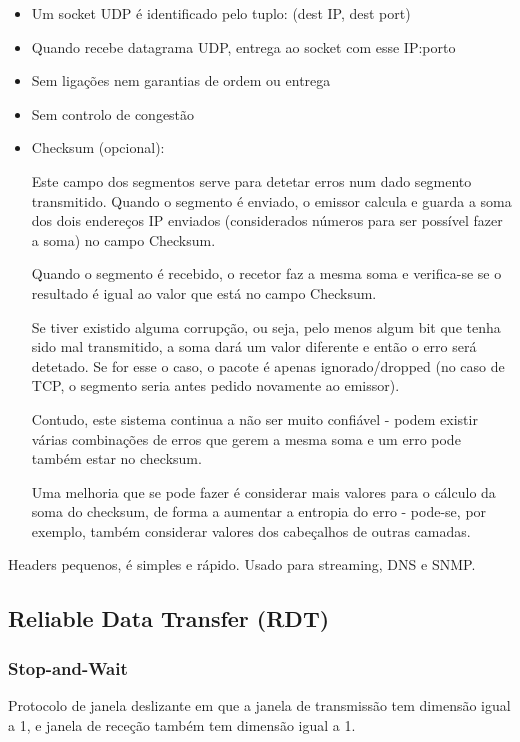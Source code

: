 \documentclass[12pt]{article}
\begin{document}
\begin{itemize}
    \item Um socket UDP é identificado pelo tuplo: (dest IP, dest port)
    \item Quando recebe datagrama UDP, entrega ao socket com esse IP:porto
    \item Sem ligações nem garantias de ordem ou entrega
    \item Sem controlo de congestão
    \item Checksum (opcional):

    Este campo dos segmentos serve para detetar erros num dado segmento transmitido.
    Quando o segmento é enviado, o emissor calcula e guarda a soma dos dois endereços IP enviados (considerados números para ser possível fazer a soma) no campo Checksum.

    Quando o segmento é recebido, o recetor faz a mesma soma e verifica-se se o resultado é igual ao valor que está no campo Checksum.

    Se tiver existido alguma corrupção, ou seja, pelo menos algum bit que tenha sido mal transmitido, a soma dará um valor diferente e então o erro será detetado.
    Se for esse o caso, o pacote é apenas ignorado/dropped (no caso de TCP, o segmento seria antes pedido novamente ao emissor).
    
    Contudo, este sistema continua a não ser muito confiável - podem existir várias combinações de erros que gerem a mesma soma e um erro pode também estar no checksum.
    
    Uma melhoria que se pode fazer é considerar mais valores para o cálculo da soma do checksum, de forma a aumentar a entropia do erro - pode-se, por exemplo, também considerar valores dos cabeçalhos de outras camadas.
\end{itemize}

Headers pequenos, é simples e rápido. Usado para streaming, DNS e SNMP.

\subsection{Reliable Data Transfer (RDT)}

\subsubsection{Stop-and-Wait}

Protocolo de janela deslizante em que a janela de transmissão tem dimensão igual a 1, e janela de receção também tem dimensão igual a 1.
\end{document}
